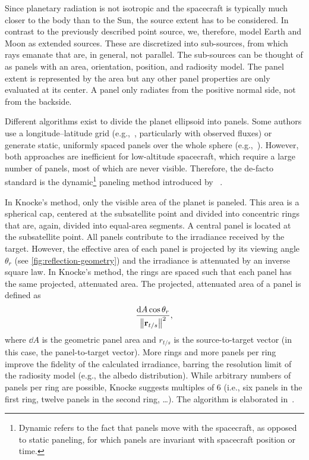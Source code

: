 Since planetary radiation is not isotropic and the spacecraft is typically much closer to the body than to the Sun, the source extent has to be considered. In contrast to the previously described point source, we, therefore, model Earth and Moon as extended sources. These are discretized into sub-sources, from which rays emanate that are, in general, not parallel. The sub-sources can be thought of as panels with an area, orientation, position, and radiosity model. The panel extent is represented by the area but any other panel properties are only evaluated at its center. A panel only radiates from the positive normal side, not from the backside.

Different algorithms exist to divide the planet ellipsoid into panels. Some authors use a longitude--latitude grid (e.g.,~\cite{RodriguezSolano2011a,Woeske2019}, particularly with observed fluxes) or generate static, uniformly spaced panels over the whole sphere (e.g.,~\cite{Wetterer2014}). However, both approaches are inefficient for low-altitude spacecraft, which require a large number of panels, most of which are never visible. Therefore, the de-facto standard is the dynamic\footnote{Dynamic refers to the fact that panels move with the spacecraft, as opposed to static paneling, for which panels are invariant with spacecraft position or time.} paneling method introduced by \citeauthor{Knocke1988}~\cite{Knocke1988}.


In Knocke's method, only the visible area of the planet is paneled. This area is a spherical cap, centered at the subsatellite point and divided into concentric rings that are, again, divided into equal-area segments. A central panel is located at the subsatellite point. All panels contribute to the irradiance received by the target. However, the effective area of each panel is projected by its viewing angle $\theta_r$ (see \cref{fig:reflection-geometry}) and the irradiance is attenuated by an inverse square law. In Knocke's method, the rings are spaced such that each panel has the same projected, attenuated area. The projected, attenuated area of a panel is defined as~\cite{Knocke1988}
\begin{align}
    \frac{\dd{A} \cos \theta_r}{\norm{\vb r_{t/s}}^2},
\end{align}
where $\dd{A}$ is the geometric panel area and $r_{t/s}$ is the source-to-target vector (in this case, the panel-to-target vector). More rings and more panels per ring improve the fidelity of the calculated irradiance, barring the resolution limit of the radiosity model (e.g., the albedo distribution). While arbitrary numbers of panels per ring are possible, Knocke suggests multiples of 6 (i.e., six panels in the first ring, twelve panels in the second ring, \dots). The algorithm is elaborated in~\cite{Knocke1989}.

